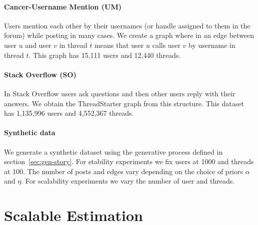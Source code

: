 \documentclass{sig-alternate}
\newcommand{\comment}[1]{\textcolor{red}{[#1]}}
\begin{document}
\paragraph{Cancer-Username Mention (UM)} Users mention each other by 
their usernames (or handle assigned to them in the
forum) while posting in many cases. We create a graph where in an edge between
user $u$ and user $v$ in thread $t$ means that user $u$ calls user $v$ by
username in thread $t$. This graph has 15,111 users and
12,440 threads.
\vspace*{-0.5\baselineskip}
\paragraph{Stack Overflow (SO)} In Stack Overflow users ask 
questions and then other users reply with their
answers. We obtain the ThreadStarter graph from this structure. This dataset has
1,135,996 users and 4,552,367 threads.
\vspace*{-0.5\baselineskip}
\paragraph{Synthetic data} We generate a synthetic dataset 
using the generative process defined in
section~\ref{sec:gen-story}. For stability experiments 
we fix users at 1000 and threads at 100. The number of 
posts and edges vary depending on the choice of priors $\alpha$ and $\eta$.
For scalability experiments we vary the number of user and threads.  


\section{Scalable Estimation}
\label{estimation}
\end{document}
